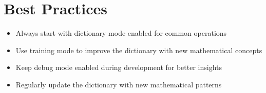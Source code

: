 \documentclass[11pt,a4paper]{article}
\makeatletter
\newcommand{\indexentry}[2]{\index{#1@\texttt{#1} #2}}
\newcommand{\indexfunc}[1]{\indexentry{#1}{function}}
\newcommand{\func}[1]{\texttt{#1}}
\makeatother
\begin{document}

    
    


    

\section{Best Practices}
\label{sec:best_practices}

\begin{itemize}
    \item Always start with dictionary mode enabled for common operations
    \item Use training mode to improve the dictionary with new mathematical concepts
    \item Keep debug mode enabled during development for better insights
    \item Regularly update the dictionary with new mathematical patterns
\end{itemize}
\end{document}
